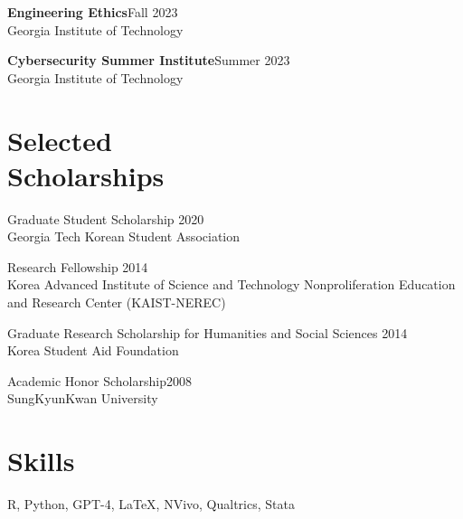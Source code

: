 \documentclass[margin,line, 10pt]{res}
\begin{document}
\begin{resume}
{\bf Engineering Ethics}\hfill{Fall 2023}\\
Georgia Institute of Technology\\
\vspace{-0.4cm}

{\bf Cybersecurity Summer Institute}\hfill{Summer 2023}\\
Georgia Institute of Technology \\
\vspace{-0.4cm}



\section{\sc Selected\\Scholarships} 
Graduate Student Scholarship  \hfill 2020\\
Georgia Tech Korean Student Association  

\vspace*{-2.5mm}
Research Fellowship \hfill 2014\\
Korea Advanced Institute of Science and Technology Nonproliferation Education and Research Center (KAIST-NEREC)

\vspace*{-2.5mm}
Graduate Research Scholarship for Humanities and Social Sciences \hfill 2014\\
Korea Student Aid Foundation

\vspace*{-2.5mm}
Academic Honor Scholarship\hfill 2008\\
SungKyunKwan University 


\section{\sc Skills} 
R, Python, GPT-4, \LaTeX, NVivo, Qualtrics, Stata




\end{resume}
\thispagestyle{lastpage}
\end{document}
